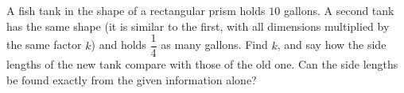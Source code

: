 A fish tank in the shape of a rectangular prism holds $10$ gallons. A second tank has the same shape (it is similar to the first, with all dimensions multiplied by the same factor $k$) and holds $\dfrac{1}{4}$ as many gallons. Find $k$, and say how the side lengths of the new tank compare with those of the old one. Can the side lengths be found exactly from the given information alone?
